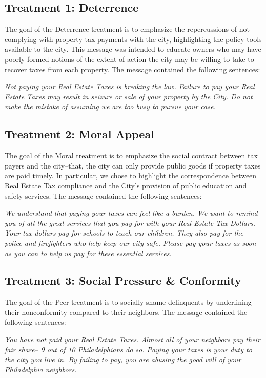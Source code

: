 \documentclass[12pt,titlepage]{article}
\begin{document}
\subsection{Treatment 1: Deterrence}

The goal of the Deterrence treatment is to emphasize the repercussions of
not-complying with property tax payments with the city, highlighting the policy tools available
to the city. This message was intended to educate owners who may have poorly-formed notions
of the extent of action the city may be willing to take to recover
taxes from each property. The message contained the following sentences:

{\it Not paying your Real Estate Taxes is breaking the law. Failure to pay your Real Estate Taxes may result in
seizure or sale of your property by the City. Do not make the mistake of assuming we are too busy
to pursue your case.}

\subsection{Treatment 2: Moral Appeal}

The goal of the Moral treatment is to emphasize the social contract
between tax payers and the city--that, the city can only provide public goods
if property taxes are paid timely.  In
particular, we chose to highlight the correspondence between Real
Estate Tax compliance and the City's provision of public education and
safety services. The message contained the following sentences:

{\it We understand that paying your taxes
can feel like a burden. We want to remind you of all the great services that
you pay for with your Real Estate Tax Dollars. Your tax dollars pay for schools to teach our children.
They also pay for the police and firefighters who help keep our city safe.
Please pay your taxes as soon as you can to help us pay for these
essential services.}

\subsection{Treatment 3: Social Pressure \& Conformity}

The goal of the Peer treatment is to socially shame delinquents
by underlining their nonconformity compared to their neighbors.
The message contained the following sentences:

{\it You have not paid your Real Estate Taxes. Almost all of your neighbors pay their fair share--
9 out of 10 Philadelphians do so. Paying your taxes is your duty to the city
you live in. By failing to pay, you are abusing the good will of your
Philadelphia neighbors.}
\end{document}
